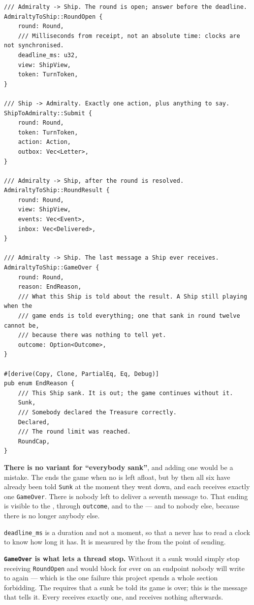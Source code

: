 \documentclass{article}
\begin{document}
\begin{lstlisting}
/// Admiralty -> Ship. The round is open; answer before the deadline.
AdmiraltyToShip::RoundOpen {
    round: Round,
    /// Milliseconds from receipt, not an absolute time: clocks are not synchronised.
    deadline_ms: u32,
    view: ShipView,
    token: TurnToken,
}

/// Ship -> Admiralty. Exactly one action, plus anything to say.
ShipToAdmiralty::Submit {
    round: Round,
    token: TurnToken,
    action: Action,
    outbox: Vec<Letter>,
}

/// Admiralty -> Ship, after the round is resolved.
AdmiraltyToShip::RoundResult {
    round: Round,
    view: ShipView,
    events: Vec<Event>,
    inbox: Vec<Delivered>,
}

/// Admiralty -> Ship. The last message a Ship ever receives.
AdmiraltyToShip::GameOver {
    round: Round,
    reason: EndReason,
    /// What this Ship is told about the result. A Ship still playing when the
    /// game ends is told everything; one that sank in round twelve cannot be,
    /// because there was nothing to tell yet.
    outcome: Option<Outcome>,
}

#[derive(Copy, Clone, PartialEq, Eq, Debug)]
pub enum EndReason {
    /// This Ship sank. It is out; the game continues without it.
    Sunk,
    /// Somebody declared the Treasure correctly.
    Declared,
    /// The round limit was reached.
    RoundCap,
}
\end{lstlisting}

\textbf{There is no variant for ``everybody sank''}, and adding one would be a mistake. The \MD{}
ends the game when no \ship{} is left afloat, but by then all six have already been told
\texttt{Sunk} at the moment they went down, and each receives exactly one \texttt{GameOver}. There
is nobody left to deliver a seventh message to. That ending is visible to the \chart{}, through
\texttt{outcome}, and to the \cartographer{} --- and to nobody else, because there is no longer
anybody else.

\texttt{deadline\_ms} is a duration and not a moment, so that a \ship{} never has to read a clock
to know how long it has. It is measured by the \admiralty{} from the point of sending.

\textbf{\texttt{GameOver} is what lets a \ship{} thread stop.} Without it a sunk \ship{} would
simply stop receiving \texttt{RoundOpen} and would block for ever on an endpoint nobody will
write to again --- which is the one failure this project spends a whole section forbidding. The
\MD{} requires that a sunk \ship{} be told its game is over; this is the message that tells it.
Every \ship{} receives exactly one, and receives nothing afterwards.
\end{document}
